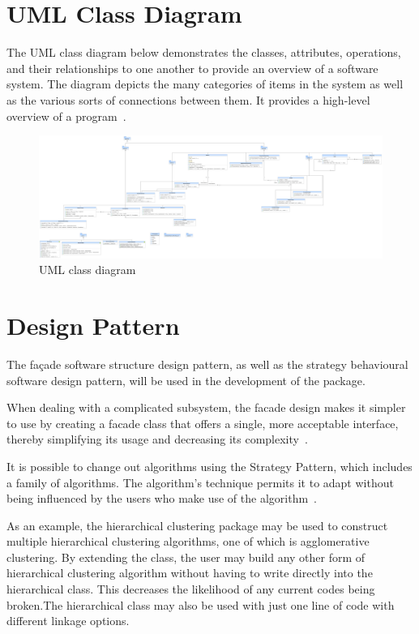 \documentclass[]{final_report}
\begin{document}
\section{UML Class Diagram}
The UML class diagram below demonstrates the classes, attributes, operations, and their relationships to one another to provide an overview of a software system. The diagram depicts the many categories of items in the system as well as the various sorts of connections between them. It provides a high-level overview of a program~\cite{pfleeger2006software}.

\begin{figure}[H]
    \centering
    \includegraphics[width=1\textwidth]{IndividualProject_2021_Wing.Lo2.umlcd.png}
    \caption{UML class diagram}
    \label{fig:class_diagram}
\end{figure}

\section{Design Pattern}
The façade software structure design pattern, as well as the strategy behavioural software design pattern, will be used in the development of the package.

When dealing with a complicated subsystem, the facade design makes it simpler to use by creating a facade class that offers a single, more acceptable interface, thereby simplifying its usage and decreasing its complexity~\cite{freeman2020head}.

It is possible to change out algorithms using the Strategy Pattern, which includes a family of algorithms. The algorithm's technique permits it to adapt without being influenced by the users who make use of the algorithm~\cite{freeman2020head}.

As an example, the hierarchical clustering package may be used to construct multiple hierarchical clustering algorithms, one of which is agglomerative clustering. By extending the class, the user may build any other form of hierarchical clustering algorithm without having to write directly into the hierarchical class. This decreases the likelihood of any current codes being broken.The hierarchical class may also be used with just one line of code with different linkage options.
\end{document}
